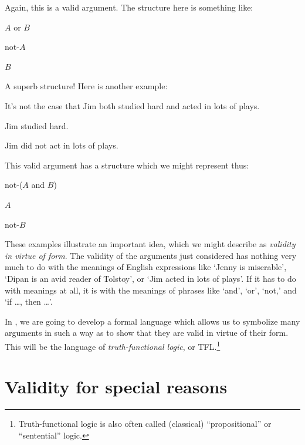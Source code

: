 Again, this is a valid argument. The structure here is something like:
	\begin{earg}
		\item[] $A$ or $B$
		\item[] not-$A$
		\item[\texttherefore] $B$
	\end{earg}
A superb structure! Here is another example:
	\begin{earg}
		\item[] It's not the case that Jim both studied hard and acted in lots of plays.
		\item[] Jim studied hard.
		\item[\texttherefore] Jim did not act in lots of plays.
	\end{earg}
This valid argument has a structure which we might represent thus:
	\begin{earg}
		\item[] not-($A$ and $B$)
		\item[] $A$
		\item[\texttherefore] not-$B$
	\end{earg}
These examples illustrate an important idea, which we might describe as \emph{validity in virtue of form}. The validity of the arguments just considered has nothing very much to do with the meanings of English expressions like `Jenny is miserable', `Dipan is an avid reader of Tolstoy', or `Jim acted in lots of plays'. If it has to do with meanings at all, it is with the meanings of phrases like `and', `or', `not,' and `if \ldots, then \ldots'.

In , we are going to develop a formal
language which allows us to symbolize many arguments in such a way as
to show that they are valid in virtue of their form. This will be the
language of \emph{truth-functional logic}, or
TFL.\footnote{Truth-functional logic is also often called (classical)
``propositional'' or ``sentential'' logic.}

\section{Validity for special reasons}

